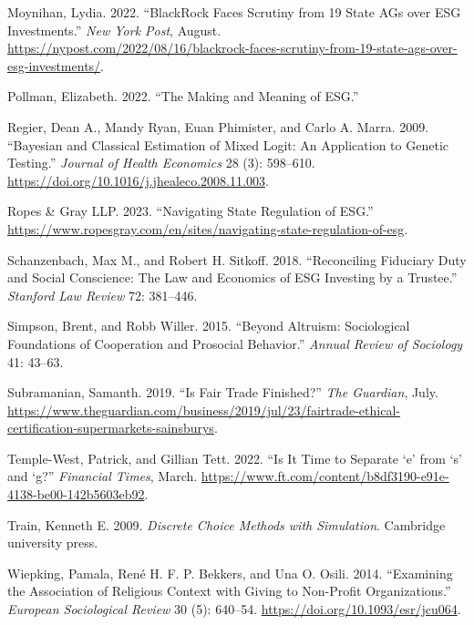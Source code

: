 \documentclass[
  12pt,
]{article}
\newlength{\cslhangindent}
\newlength{\cslentryspacingunit} %
\newenvironment{CSLReferences}[2] %
 {%
  \setlength{\parindent}{0pt}
  \ifodd #1
  \let\oldpar\par
  \def\par{\hangindent=\cslhangindent\oldpar}
  \fi
  \setlength{\parskip}{#2\cslentryspacingunit}
 }%
 {}
\begin{document}
\begin{CSLReferences}{1}{0}
\leavevmode{}%
Moynihan, Lydia. 2022. {``BlackRock Faces Scrutiny from 19 State AGs over ESG Investments.''} \emph{New York Post}, August. \url{https://nypost.com/2022/08/16/blackrock-faces-scrutiny-from-19-state-ags-over-esg-investments/}.

\leavevmode{}%
Pollman, Elizabeth. 2022. {``The Making and Meaning of ESG.''}

\leavevmode{}%
Regier, Dean A., Mandy Ryan, Euan Phimister, and Carlo A. Marra. 2009. {``Bayesian and Classical Estimation of Mixed Logit: An Application to Genetic Testing.''} \emph{Journal of Health Economics} 28 (3): 598--610. \url{https://doi.org/10.1016/j.jhealeco.2008.11.003}.

\leavevmode{}%
Ropes \& Gray LLP. 2023. {``Navigating State Regulation of ESG.''} \url{https://www.ropesgray.com/en/sites/navigating-state-regulation-of-esg}.

\leavevmode{}%
Schanzenbach, Max M., and Robert H. Sitkoff. 2018. {``Reconciling Fiduciary Duty and Social Conscience: The Law and Economics of ESG Investing by a Trustee.''} \emph{Stanford Law Review} 72: 381--446.

\leavevmode{}%
Simpson, Brent, and Robb Willer. 2015. {``Beyond Altruism: Sociological Foundations of Cooperation and Prosocial Behavior.''} \emph{Annual Review of Sociology} 41: 43--63.

\leavevmode{}%
Subramanian, Samanth. 2019. {``Is Fair Trade Finished?''} \emph{The Guardian}, July. \url{https://www.theguardian.com/business/2019/jul/23/fairtrade-ethical-certification-supermarkets-sainsburys}.

\leavevmode{}%
Temple-West, Patrick, and Gillian Tett. 2022. {``Is It Time to Separate {`}e{'} from {`}s{'} and {`}g?''} \emph{Financial Times}, March. \url{https://www.ft.com/content/b8df3190-e91e-4138-be00-142b5603eb92}.

\leavevmode{}%
Train, Kenneth E. 2009. \emph{Discrete Choice Methods with Simulation}. Cambridge university press.

\leavevmode{}%
Wiepking, Pamala, René H. F. P. Bekkers, and Una O. Osili. 2014. {``Examining the Association of Religious Context with Giving to Non-Profit Organizations.''} \emph{European Sociological Review} 30 (5): 640--54. \url{https://doi.org/10.1093/esr/jcu064}.

\end{CSLReferences}
\end{document}
